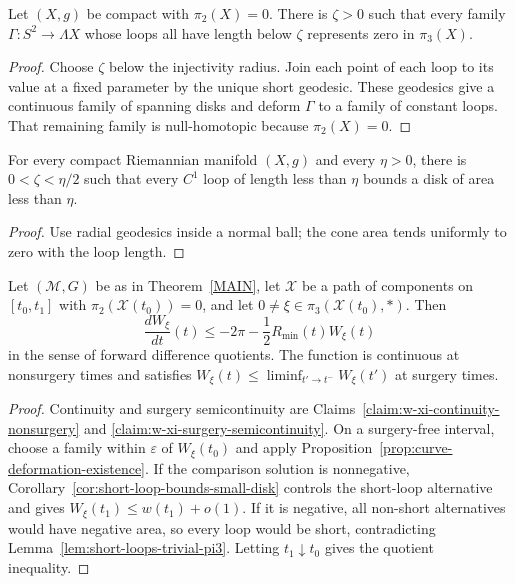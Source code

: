 \begin{lemma}
\label{lem:short-loops-trivial-pi3}
\label{shortpi2triv}
Let $(X,g)$ be compact with $\pi_2(X)=0$. There is $\zeta>0$ such that every
family $\Gamma\colon S^2\to\Lambda X$ whose loops all have length below
$\zeta$ represents zero in $\pi_3(X)$.
\end{lemma}
\begin{proof}
\sketch Choose $\zeta$ below the injectivity radius. Join each point of each
loop to its value at a fixed parameter by the unique short geodesic. These
geodesics give a continuous family of spanning disks and deform $\Gamma$ to a
family of constant loops. That remaining family is null-homotopic because
$\pi_2(X)=0$.
\end{proof}

\begin{corollary}
\label{cor:short-loop-bounds-small-disk}
\label{shlnsharea}
For every compact Riemannian manifold $(X,g)$ and every $\eta>0$, there is
$0<\zeta<\eta/2$ such that every $C^1$ loop of length less than $\eta$ bounds
a disk of area less than $\eta$.
\end{corollary}
\begin{proof}
\sketch Use radial geodesics inside a normal ball; the cone area tends
uniformly to zero with the loop length.
\end{proof}

\begin{proposition}
\label{prop:w3-forward-difference-quotient}
\label{W_3fordiff}
Let $({\mathcal M},G)$ be as in Theorem~\ref{MAIN}, let ${\mathcal X}$ be a
path of components on $[t_0,t_1]$ with
$\pi_2({\mathcal X}(t_0))=0$, and let
$0\ne\xi\in\pi_3({\mathcal X}(t_0),*)$. Then
\[
\frac{dW_\xi}{dt}(t)\le-2\pi-\frac12R_{\min}(t)W_\xi(t)
\]
in the sense of forward difference quotients. The function is continuous at
nonsurgery times and satisfies
$W_\xi(t)\le\liminf_{t'\to t^-}W_\xi(t')$ at surgery times.
\end{proposition}
\begin{proof}
\sketch Continuity and surgery semicontinuity are
Claims~\ref{claim:w-xi-continuity-nonsurgery} and
\ref{claim:w-xi-surgery-semicontinuity}. On a surgery-free interval, choose a
family within $\varepsilon$ of $W_\xi(t_0)$ and apply
Proposition~\ref{prop:curve-deformation-existence}. If the comparison solution
is nonnegative, Corollary~\ref{cor:short-loop-bounds-small-disk} controls the
short-loop alternative and gives $W_\xi(t_1)\le w(t_1)+o(1)$. If it is
negative, all non-short alternatives would have negative area, so every loop
would be short, contradicting Lemma~\ref{lem:short-loops-trivial-pi3}. Letting
$t_1\downarrow t_0$ gives the quotient inequality.
\end{proof}

